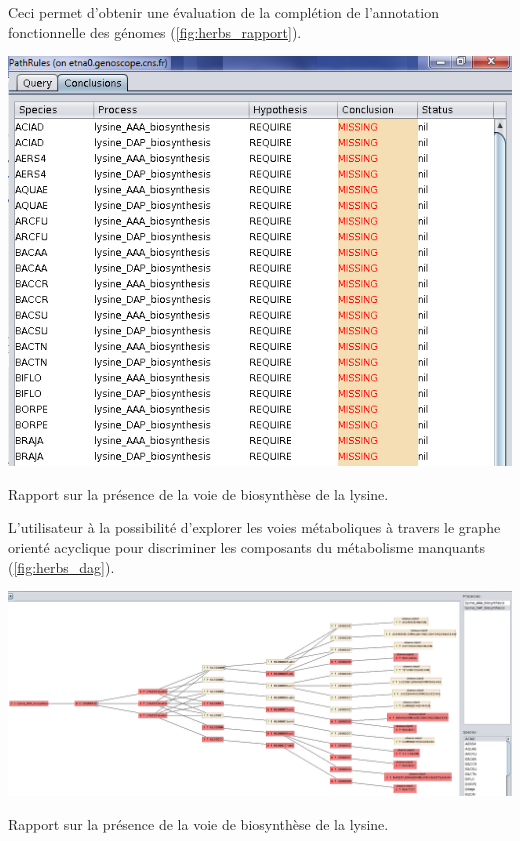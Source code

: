 \begin{refsegment}
Ceci permet d'obtenir une évaluation de la complétion de l'annotation fonctionnelle des génomes (\cref{fig:herbs_rapport}).

\begin{shadedfigure}[H]
    \centering
    \includegraphics[width=\textwidth]{img/herbs_conclusion_report.png}
    \caption{Rapport sur la présence de la voie de biosynthèse de la lysine.}
    \label{fig:herbs_rapport}
\end{shadedfigure}

L'utilisateur à la possibilité d'explorer les voies métaboliques à travers le graphe orienté acyclique pour discriminer les composants du métabolisme manquants (\cref{fig:herbs_dag}).

\begin{landscape}
    \begin{shadedfigure}[H]
        \centering
        \includegraphics[width=\textwidth]{img/herbs_aciad_lysine_dap.png}
        \caption{Rapport sur la présence de la voie de biosynthèse de la lysine.}
        \label{fig:herbs_dag}
    \end{shadedfigure}
\end{landscape}



\end{refsegment}
